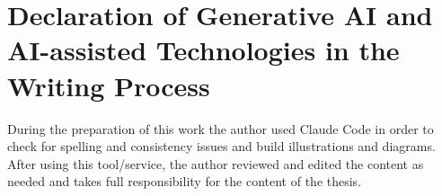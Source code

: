 \section{Declaration of Generative AI and AI-assisted Technologies in the Writing Process}\label{sec:ai-declaration}

During the preparation of this work the author used Claude Code in order to check for spelling and consistency issues
and build illustrations and diagrams.
After using this tool/service, the author reviewed and edited the content as needed and takes full responsibility for
the content of the thesis.
